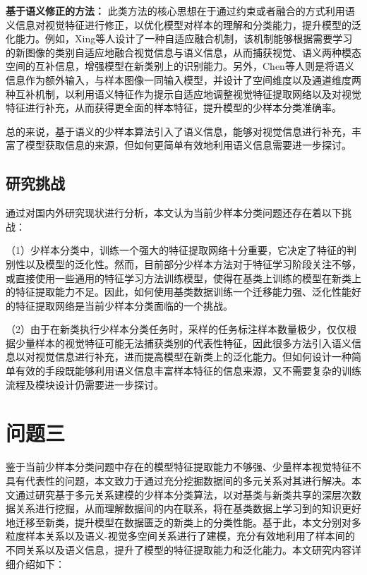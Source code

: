 \textbf{基于语义修正的方法：} 此类方法的核心思想在于通过约束或者融合的方式利用语义信息对视觉特征进行修正，以优化模型对样本的理解和分类能力，提升模型的泛化能力。例如，Xing等人\cite{AM3}设计了一种自适应融合机制，该机制能够根据需要学习的新图像的类别自适应地融合视觉信息与语义信息，从而捕获视觉、语义两种模态空间的互补信息，增强模型在新类别上的识别能力。另外，Chen等人\cite{SP-CLIP}则是将语义信息作为额外输入，与样本图像一同输入模型，并设计了空间维度以及通道维度两种互补机制，以利用语义特征作为提示自适应地调整视觉特征提取网络以及对视觉特征进行补充，从而获得更全面的样本特征，提升模型的少样本分类准确率。

总的来说，基于语义的少样本算法引入了语义信息，能够对视觉信息进行补充，丰富了模型获取信息的来源，但如何更简单有效地利用语义信息需要进一步探讨。

\subsection[\hspace{-2pt}研究挑战]{{\heiti{} \hspace{-8pt}研究挑战}}\label{section1: 研究挑战}

通过对国内外研究现状进行分析，本文认为当前少样本分类问题还存在着以下挑战：

（1）少样本分类中，训练一个强大的特征提取网络十分重要，它决定了特征的判别性以及模型的泛化性。然而，目前部分少样本方法对于特征学习阶段关注不够，或直接使用一些通用的特征学习方法训练模型，使得在基类上训练的模型在新类上的特征提取能力不足。因此，如何使用基类数据训练一个迁移能力强、泛化性能好的特征提取网络是当前少样本分类面临的一个挑战。

（2）由于在新类执行少样本分类任务时，采样的任务标注样本数量极少，仅仅根据少量样本的视觉特征可能无法捕获类别的代表性特征，因此很多方法引入语义信息以对视觉信息进行补充，进而提高模型在新类上的泛化能力。但如何设计一种简单有效的手段既能够利用语义信息丰富样本特征的信息来源，又不需要复杂的训练流程及模块设计仍需要进一步探讨。

\section[\hspace{-2pt}问题三]{{\heiti{} \hspace{-8pt}问题三}}\label{section1: 问题三}

鉴于当前少样本分类问题中存在的模型特征提取能力不够强、少量样本视觉特征不具有代表性的问题，本文致力于通过充分挖掘数据间的多元关系对其进行解决。本文通过研究基于多元关系建模的少样本分类算法，以对基类与新类共享的深层次数据关系进行挖掘，从而理解数据间的内在联系，将在基类数据上学习到的知识更好地迁移至新类，提升模型在数据匮乏的新类上的分类性能。基于此，本文分别对多粒度样本关系以及语义-视觉多空间关系进行了建模，充分有效地利用了样本间的不同关系以及语义信息，提升了模型的特征提取能力和泛化能力。本文研究内容详细介绍如下：

